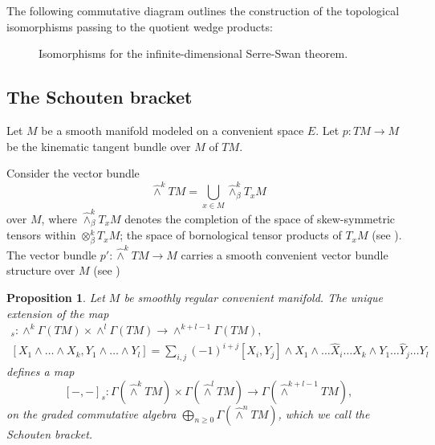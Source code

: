 \documentclass[11pt,reqno]{amsart}
\newtheorem{proposition}[theorem]{Proposition}
\theoremstyle{definition}
\numberwithin{equation}{section}
\begin{document}
The following commutative diagram outlines the construction of the topological isomorphisms passing to the quotient wedge products:

\begin{figure}[h]
    \centering
    \caption{Isomorphisms for the infinite-dimensional Serre-Swan theorem.}
    \label{fig:wedge_isomorphism}
\end{figure}
\subsection{The Schouten bracket}\cite{24}
Let $M$ be a smooth manifold modeled on a convenient space $E$. Let $p:TM\to M$ be the kinematic tangent bundle over $M$ of $TM$. 



Consider the vector bundle \[\hat\wedge^k TM = \bigcup_{x \in M}  \hat\wedge^k_{\beta} T_xM\] over $M$, where $ \hat\wedge^k_{\beta} T_xM$ denotes the completion of the space of skew-symmetric tensors within $ \otimes^k_{\beta} T_xM$; the space of bornological tensor products of $T_xM$ (see \cite[Chapter 1, 5.7]{20}). The vector bundle  $p':\hat\wedge^k TM\to M$ carries a smooth convenient vector bundle structure over $M$ (see \cite[section 1.3]{24})



\begin{proposition}
Let $M$ be smoothly regular convenient manifold. The unique extension of the map
\begin{align*}
    [-,-]_s : \wedge^k \Gamma (TM) \times \wedge^l \Gamma(TM) \rightarrow \wedge^{k+l-1} \Gamma(TM),\\
[X_1 \wedge \dots \wedge X_k, Y_1 \wedge \dots \wedge Y_l] = \sum_{i,j} (-1)^{i+j} [X_i, Y_j] \wedge X_1 \wedge \dots \hat{X}_i \dots X_k \wedge Y_1 \dots \hat{Y}_j \dots Y_l
\end{align*}
defines a map
\[
[-,-]_s : \Gamma(\hat\wedge^k TM) \times \Gamma(\hat\wedge^l TM) \rightarrow \Gamma(\hat\wedge^{k+l-1} TM),
\]
on the  graded commutative algebra $\bigoplus_{n\geq0}\Gamma(\hat\wedge^n TM)$, which we call the Schouten bracket.
\end{proposition}
\end{document}
